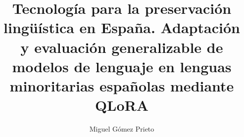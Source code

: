 \documentclass[%
    school=etsisi,%
    type=pfg,%
    degree=61CDIA,%
    authorsex=m,%
    directorsex=p,%
]{upm-report}
\author{Miguel Gómez Prieto}
\title{Tecnología para la preservación lingüística en España. Adaptación y evaluación generalizable de modelos de lenguaje en lenguas minoritarias españolas mediante QLoRA}
\begin{document}


\frontmatter

\tableofcontents
\listoffigures
\listoftables

\mainmatter

\begingroup
\sloppy











\endgroup
\printbibliography


% 

\printglossary
\end{document}
